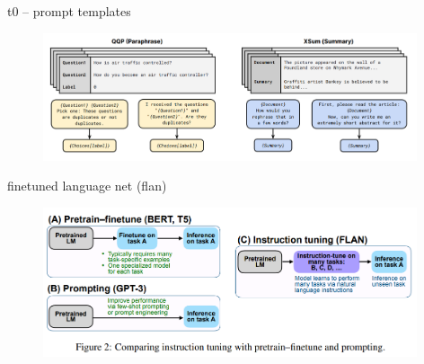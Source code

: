 
\begin{frame}{t0 -- prompt templates}

\vfill
	
	\begin{figure}
		\centering
		\includegraphics[width = 11cm]{figure/81-t0-prompts.png}\\ 
	\end{figure}

\vfill

\end{frame}


\begin{frame}{finetuned language net (flan)}

\vfill
	
	\begin{figure}
		\centering
		\includegraphics[width = 11cm]{figure/81-flan.png}\\ 
	\end{figure}

\vfill

\end{frame}



